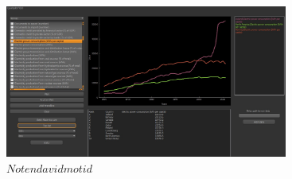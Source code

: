 \documentclass[paper=a4, fontsize=11pt]{scrartcl}
\begin{document}
\begin{figure}[H]
\begin{center}
\includegraphics[height=50mm]{images/energy_comparison.jpg}
\caption{$ Notendavidmotid $\label{fig:gui}}
\end{center}
\end{figure}
\end{document}
